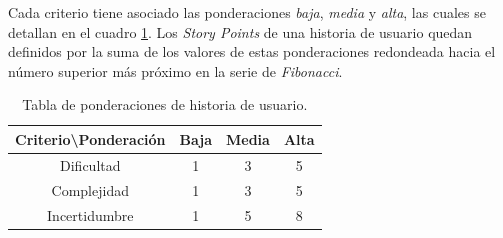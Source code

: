 \documentclass[
11pt, %
]{charter}
\begin{document}
Cada criterio tiene asociado las ponderaciones \textit{baja}, \textit{media} y \textit{alta}, las cuales se detallan en el cuadro \ref{table:ponderaciones}. Los \textit{Story Points} de una historia de usuario quedan definidos por la suma de los valores de estas ponderaciones redondeada hacia el número superior más próximo en la serie de \textit{Fibonacci}.

\begin{table}[htpb]
\centering
\begin{tabular}{|c|c|c|c|}
\hline
\rowcolor[HTML]{C0C0C0}
Criterio\textbackslash Ponderación & Baja & Media & Alta \\ \hline
Dificultad & 1 & 3 & 5 \\ \hline
Complejidad & 1 & 3 & 5 \\ \hline
Incertidumbre & 1 & 5 & 8 \\ \hline
\end{tabular}
\caption{Tabla de ponderaciones de historia de usuario.}
\label{table:ponderaciones}
\end{table}
\end{document}
